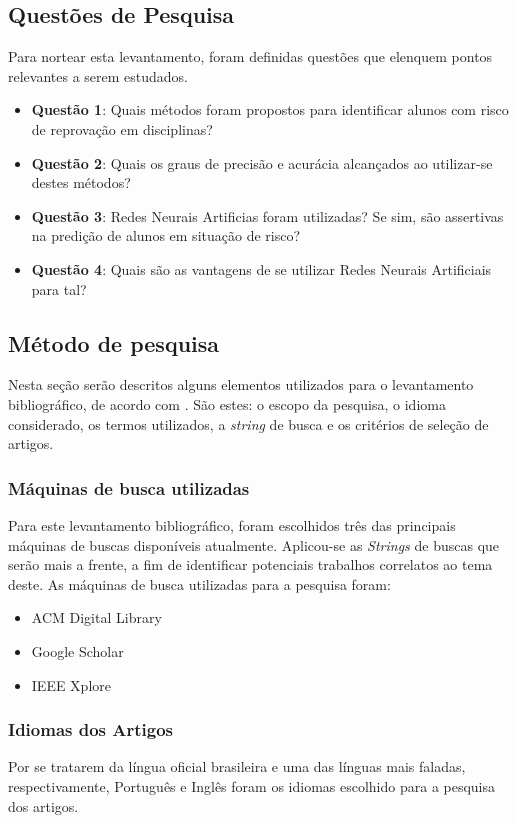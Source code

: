 \documentclass[
	12pt,				%
	openright,			%
	oneside,
	a4paper,			%
	english,			%
	french,				%
	spanish,			%
	brazil,				%
	]{abntex2}
\begin{document}
\subsection{Questões de Pesquisa}
\label{sec:QP}
Para nortear esta levantamento, foram definidas questões que elenquem pontos relevantes a serem estudados.
\begin{itemize}
    \item \textbf{Questão 1}: Quais métodos foram propostos para identificar alunos com risco de reprovação em disciplinas?
    \item \textbf{Questão 2}: Quais os graus de precisão e acurácia alcançados ao utilizar-se destes métodos?
    \item \textbf{Questão 3}: Redes Neurais Artificias foram utilizadas? Se sim, são assertivas na predição de alunos em situação de risco?
    \item \textbf{Questão 4}: Quais são as vantagens de se utilizar Redes Neurais Artificiais para tal?
\end{itemize}

\subsection{Método de pesquisa}
\label{sec:MP}
Nesta seção serão descritos alguns elementos utilizados para o levantamento bibliográfico, de acordo com . São estes: o escopo da pesquisa, o idioma considerado, os termos utilizados, a \textit{string} de busca e os critérios de seleção de artigos.


\subsubsection{Máquinas de busca utilizadas}
Para este levantamento bibliográfico, foram escolhidos três das principais máquinas de buscas disponíveis atualmente. Aplicou-se as \textit{Strings} de buscas que serão mais a frente, a fim de identificar potenciais trabalhos correlatos ao tema deste. As máquinas de busca utilizadas para a pesquisa foram:
\begin{itemize}
    \item ACM Digital Library
    \item Google Scholar
    \item IEEE Xplore
\end{itemize}

\subsubsection{Idiomas dos Artigos}
Por se tratarem da língua oficial brasileira e uma das línguas mais faladas, respectivamente, Português e Inglês foram os idiomas escolhido para a pesquisa dos artigos.
\end{document}
